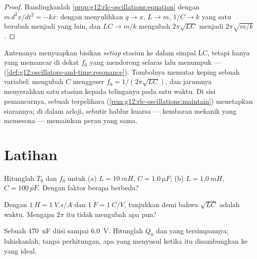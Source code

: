 \begin{proof}
Bandingkanlah \cref{prop:g12:rlc-oscillations:equation} dengan
$m\,d^2x/dt^2 = -kx$: dengan menyulihkan $q \to x$, $L \to m$, $1/C \to k$
yang satu berubah menjadi yang lain, dan $LC \to m/k$ mengubah
$2\pi\sqrt{LC}$ menjadi $2\pi\sqrt{m/k}$.
\end{proof}

\begin{example}\label{ex:g12:rlc-oscillations:tuning}
Antenanya menyuapkan bisikan \emph{setiap} stasiun ke dalam simpal LC, tetapi
hanya yang memancar di dekat $f_0$ yang mendorong selaras lalu menumpuk ---
 (\cref{def:g12:oscillators-and-time:resonance}). Tombolnya
memutar keping sebuah  variabel: mengubah $C$ menggeser
$f_0 = 1/(2\pi\sqrt{LC})$, dan jarumnya menyerahkan satu stasiun kepada
telinganya pada satu waktu. Di sisi pemancarnya, sebuah  terpelihara
(\cref{rem:g12:rlc-oscillations:maintain}) menetapkan  siarannya;
di dalam arloji, sebutir hablur kuarsa --- kembaran mekanik yang
 memesona --- memainkan peran yang sama.
\end{example}

\section{Latihan}

\begin{exercise}[$\star$]\label{exo:g12:rlc-oscillations:1}
Hitunglah $T_0$ dan $f_0$ untuk (a) $L = \qty{10}{mH}$,
$C = \qty{1.0}{\micro F}$; (b) $L = \qty{1.0}{mH}$,
$C = \qty{100}{pF}$. Dengan faktor berapa  berbeda?
\end{exercise}

\begin{exercise}[$\star$]\label{exo:g12:rlc-oscillations:2}
Dengan $\qty{1}{H} = \qty{1}{V.s/A}$ dan $\qty{1}{F} = \qty{1}{C/V}$,
tunjukkan  demi  bahwa $\sqrt{LC}$ adalah waktu. Mengapa $2\pi$ itu
tidak mengubah apa pun?
\end{exercise}

\begin{exercise}[$\star$]\label{exo:g12:rlc-oscillations:3}
Sebuah  \qty{470}{nF} diisi sampai \qty{6.0}{V}. Hitunglah $Q_0$
dan  yang tersimpannya; lukiskanlah, tanpa perhitungan, apa yang menyusul
ketika  itu disambungkan ke  yang ideal.
\end{exercise}

